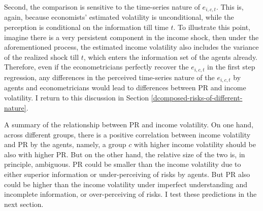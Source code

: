 Second, the comparison is sensitive to the time-series nature of $e_{i,c,t}$. This is, again, because economists' estimated volatility is unconditional, while the perception is conditional on the information till time $t$. To illustrate this point, imagine there is a very persistent component in the income shock, then under the aforementioned process, the estimated income volatility also includes the variance of the realized shock till $t$, which enters the information set of the agents already. Therefore, even if the econometricians perfectly recover the $e_{i,c,t}$ in the first step regression, any differences in the perceived time-series nature of the $e_{i,c,t}$ by agents and econometricians would lead to differences between PR and income volatility. I return to this discussion in Section \ref{dcomposed-risks-of-different-nature}. 

A summary of the relationship between PR and income volatility. On one hand, across different groups, there is a positive correlation between income volatility and PR by the agents, namely, a group $c$ with higher income volatility should be also with higher PR. But on the other hand, the relative size of the two is, in principle, ambiguous. PR could be smaller than the income volatility due to either superior information or under-perceiving of risks by agents. But PR also could be higher than the income volatility under imperfect understanding and incomplete information, or over-perceiving of risks. I test these predictions in the next section. 


